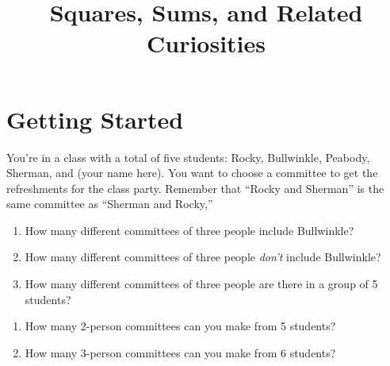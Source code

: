 \documentclass[12pt,raggedbottom,nosectionbreak]{cme}
\title{Squares, Sums, and Related Curiosities}
\begin{document}
\chapter*{Getting Started}

\begin{foryou}
You're in a class with a total of five students: Rocky, Bullwinkle, Peabody, Sherman, and (your name here). You want to choose a committee to get the refreshments for the class party. Remember that ``Rocky and Sherman'' is the same committee as ``Sherman and Rocky,''

\begin{problem} \label{fipro}
\begin{enumerate}
 
  \item  How many different committees of three people include Bullwinkle?

   \item   How many different committees of three people \emph{don't} include Bullwinkle?
  
 \item   How many different committees of three people are there in a group of 5 students?
     
 
\end{enumerate}
\end{problem}
  \end{foryou}




\begin{problem}
 \begin{enumerate}
\item  How many 2-person committees can you make from 5 students?
\item  How many 3-person committees can you make from 6 students?

\end{enumerate}
\end{problem}
\end{document}
